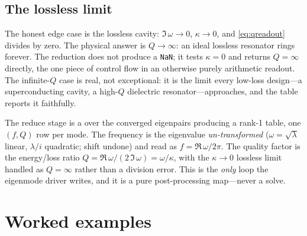 \subsection{The lossless limit}

The honest edge case is the lossless cavity: $\Im\,\omega\to 0$, $\kappa\to 0$,
and \cref{eq:qreadout} divides by zero. The physical answer is $Q\to\infty$: an
ideal lossless resonator rings forever. The reduction does not produce a
\texttt{NaN}; it tests $\kappa=0$ and returns $Q=\infty$ directly, the one piece
of control flow in an otherwise purely arithmetic readout. The infinite-$Q$ case
is real, not exceptional: it is the limit every low-loss design---a
superconducting cavity, a high-$Q$ dielectric resonator---approaches, and the
table reports it faithfully.

\begin{keyidea}
The reduce stage is a  over the converged eigenpairs producing a
rank-1 table, one $(f,Q)$ row per mode. The frequency is the eigenvalue
\emph{un-transformed} ($\omega=\sqrt\lambda$ linear, $\lambda/i$ quadratic; shift
undone) and read as $f=\Re\,\omega/2\pi$. The quality factor is the
energy/loss ratio $Q=\Re\,\omega/(2\,\Im\,\omega)=\omega/\kappa$, with the
$\kappa\to0$ lossless limit handled as $Q=\infty$ rather than a division error.
This is the \emph{only} loop the eigenmode driver writes, and it is a pure
post-processing map---never a solve.
\end{keyidea}

\section{Worked examples}


